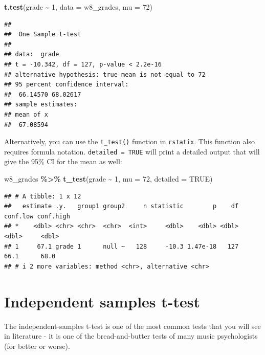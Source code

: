 \documentclass[
]{book}
\newenvironment{Shaded}{\begin{snugshade}}{\end{snugshade}}
\newcommand{\AttributeTok}[1]{\textcolor[rgb]{0.13,0.29,0.53}{#1}}
\newcommand{\ConstantTok}[1]{\textcolor[rgb]{0.56,0.35,0.01}{#1}}
\newcommand{\DecValTok}[1]{\textcolor[rgb]{0.00,0.00,0.81}{#1}}
\newcommand{\FunctionTok}[1]{\textcolor[rgb]{0.13,0.29,0.53}{\textbf{#1}}}
\newcommand{\NormalTok}[1]{#1}
\newcommand{\SpecialCharTok}[1]{\textcolor[rgb]{0.81,0.36,0.00}{\textbf{#1}}}
\begin{document}
\begin{Shaded}
\begin{Highlighting}[]
\FunctionTok{t.test}\NormalTok{(grade }\SpecialCharTok{\textasciitilde{}} \DecValTok{1}\NormalTok{, }\AttributeTok{data =}\NormalTok{ w8\_grades, }\AttributeTok{mu =} \DecValTok{72}\NormalTok{)}
\end{Highlighting}
\end{Shaded}

\begin{verbatim}
## 
##  One Sample t-test
## 
## data:  grade
## t = -10.342, df = 127, p-value < 2.2e-16
## alternative hypothesis: true mean is not equal to 72
## 95 percent confidence interval:
##  66.14570 68.02617
## sample estimates:
## mean of x 
##  67.08594
\end{verbatim}

Alternatively, you can use the \texttt{t\_test()} function in \texttt{rstatix}. This function also requires formula notation. \texttt{detailed\ =\ TRUE} will print a detailed output that will give the 95\% CI for the mean as well:

\begin{Shaded}
\begin{Highlighting}[]
\NormalTok{w8\_grades }\SpecialCharTok{\%\textgreater{}\%}
  \FunctionTok{t\_test}\NormalTok{(grade }\SpecialCharTok{\textasciitilde{}} \DecValTok{1}\NormalTok{, }\AttributeTok{mu =} \DecValTok{72}\NormalTok{, }\AttributeTok{detailed =} \ConstantTok{TRUE}\NormalTok{)}
\end{Highlighting}
\end{Shaded}

\begin{verbatim}
## # A tibble: 1 x 12
##   estimate .y.   group1 group2     n statistic        p    df conf.low conf.high
## *    <dbl> <chr> <chr>  <chr>  <int>     <dbl>    <dbl> <dbl>    <dbl>     <dbl>
## 1     67.1 grade 1      null ~   128     -10.3 1.47e-18   127     66.1      68.0
## # i 2 more variables: method <chr>, alternative <chr>
\end{verbatim}

\hypertarget{independent-samples-t-test}{%
\section{Independent samples t-test}\label{independent-samples-t-test}}

The independent-samples t-test is one of the most common tests that you will see in literature - it is one of the bread-and-butter tests of many music psychologists (for better or worse).
\end{document}
